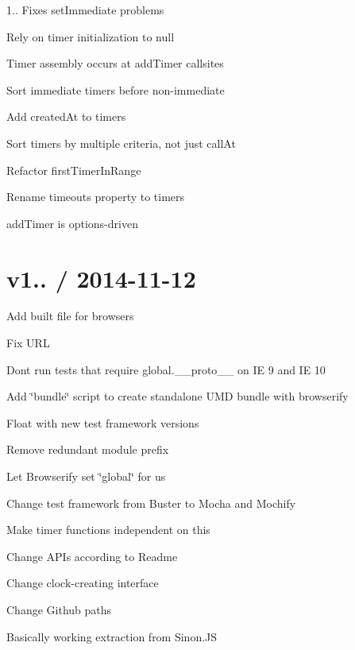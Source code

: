 \begin{DoxyItemize}
\item 1.. Fixes set\+Immediate problems
\item Rely on {\ttfamily timer} initialization to null
\item Timer assembly occurs at add\+Timer callsites
\item Sort immediate timers before non-\/immediate
\item Add created\+At to timers
\item Sort timers by multiple criteria, not just call\+At
\item Refactor first\+Timer\+In\+Range
\item Rename {\ttfamily timeouts} property to {\ttfamily timers}
\item add\+Timer is options-\/driven
\end{DoxyItemize}

\section*{v1.. / 2014-\/11-\/12 }


\begin{DoxyItemize}
\item Add built file for browsers
\item Fix U\+RL
\item Don\textquotesingle{}t run tests that require global.\+\_\+\+\_\+proto\+\_\+\+\_\+ on IE 9 and IE 10
\item Add \char`\"{}bundle\char`\"{} script to create standalone U\+MD bundle with browserify
\item Float with new test framework versions
\item Remove redundant module prefix
\item Let Browserify set \char`\"{}global\char`\"{} for us
\item Change test framework from Buster to Mocha and Mochify
\item Make timer functions independent on {\ttfamily this}
\item Change A\+P\+Is according to Readme
\item Change clock-\/creating interface
\item Change Github paths
\item Basically working extraction from Sinon.\+JS 
\end{DoxyItemize}